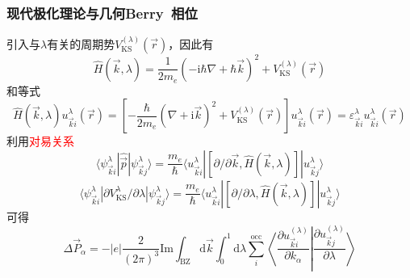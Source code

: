 {\frame
{
	\frametitle{现代极化理论与几何\textrm{Berry~}相位}
		引入与$\lambda$有关的周期势$V_{\mathrm{KS}}^{(\lambda)}(\vec r)$，因此有
	\begin{displaymath}
		\hat H(\vec k,\lambda)=\frac1{2m_e}\left( -\mathrm{i}\hbar\nabla+\hbar\vec k \right)^2+V_{\mathrm{KS}}^{(\lambda)}(\vec r)
	\end{displaymath}
	和等式
	\begin{displaymath}
		\hat H(\vec k,\lambda)u_{\vec k i}^{\lambda}(\vec r)=\left[ -\frac{\hbar}{2m_e}(\nabla+\mathrm{i}\vec k)^2 +V_{\mathrm{KS}}^{(\lambda)}(\vec r)\right]u_{\vec k i}^{\lambda}(\vec r)=\varepsilon_{\vec k i}^{\lambda}u_{\vec k i}^{\lambda}(\vec r)
	\end{displaymath}
	利用\textcolor{red}{对易关系}
	\begin{displaymath}
		\langle\psi_{\vec k i}^{\lambda}|\hat{\vec p}|\psi_{\vec k j}^{\lambda}\rangle=\frac{m_e}{\hbar}\langle u_{\vec k i}^{\lambda}|[\partial/\partial\vec k,\hat H(\vec k,\lambda)]|u_{\vec k j}^{\lambda}\rangle
	\end{displaymath}
	\begin{displaymath}
		\langle\psi_{\vec k i}^{\lambda}|\partial V_{\mathrm{KS}}^{\lambda}/\partial\lambda|\psi_{\vec k j}^{\lambda}\rangle=\frac{m_e}{\hbar}\langle u_{\vec k i}^{\lambda}|[\partial/\partial\lambda,\hat H(\vec k,\lambda)]|u_{\vec k j}^{\lambda}\rangle
	\end{displaymath}
	可得
	\begin{displaymath}
		\Delta\vec P_{\alpha}=-|e|\frac2{(2\pi)^3}\mathrm{Im}\int_{\mathrm{BZ}}\mathrm{d}\vec k\int_0^1\mathrm{d}\lambda\sum_i^{\mathrm{occ}}\left\langle\frac{\partial u_{\vec k i}^{(\lambda)}}{\partial k_{\alpha}}\right|\left.\frac{\partial u_{\vec k j}^{(\lambda)}}{\partial\lambda}\right\rangle
	\end{displaymath}
}

}
